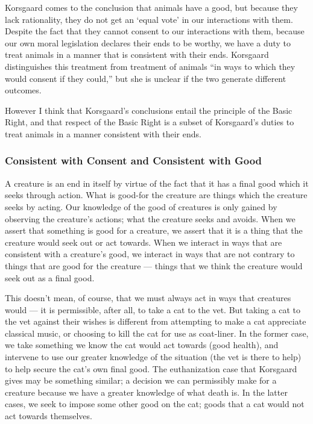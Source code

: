 		Korsgaard comes to the conclusion that animals have a good, but because
		they lack rationality, they do not get an ‘equal vote’ in our
		interactions with them.\autocite[12.2.1]{kors} Despite the fact that
		they cannot consent to our interactions with them, because our own
		moral legislation declares their ends to be worthy, we have a duty to
		treat animals in a manner that is consistent with their
		ends.\autocite[12.2.1]{kors} Korsgaard distinguishes this treatment
		from treatment of animals “in ways to which they would consent if they
		could,” but she is unclear if the two generate different
		outcomes.\autocite[12.2.1]{kors}

		However I think that Korsgaard’s conclusions entail the principle of
		the Basic Right, and that respect of the Basic Right is a subset of
		Korsgaard’s duties to treat animals in a manner consistent with their
		ends.

		\subsubsection{Consistent with Consent and Consistent with Good}

			A creature is an end in itself by virtue of the fact that it has a
			final good which it seeks through action.  What is good-for the
			creature are things which the creature seeks by acting.  Our
			knowledge of the good of creatures is only gained by observing the
			creature’s actions; what the creature seeks and avoids.  When we
			assert that something is good for a creature, we assert that it is
			a thing that the creature would seek out or act towards.  When we
			interact in ways that are consistent with a creature’s good, we
			interact in ways that are not contrary to things that are good for
			the creature --- things that we think the creature would seek out
			as a final good.

			This doesn’t mean, of course, that we must always act in ways that
			creatures would --- it is permissible, after all, to take a cat to
			the vet.  But taking a cat to the vet against their wishes is
			different from attempting to make a cat appreciate classical music,
			or choosing to kill the cat for use as coat-liner.  In the former
			case, we take something we know the cat would act towards (good
			health), and intervene to use our greater knowledge of the
			situation (the vet is there to help) to help secure the cat’s own
			final good.  The euthanization case that Korsgaard gives may be
			something similar; a decision we can permissibly make for a
			creature because we have a greater knowledge of what death
			is.\autocite[12.2.1]{kors} In the latter cases, we seek to impose
			some other good on the cat; goods that a cat would not act towards
			themselves.

